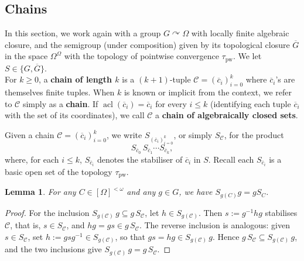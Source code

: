 \documentclass{article}
\newtheorem{lemma}[theorem]{Lemma}
\theoremstyle{remark}
\theoremstyle{definition}
\def\acts{\curvearrowright}
\DeclareMathOperator{\acl}{acl}
\newcommand{\nn}[0]{S}%
\newcommand{\pw}[0]{\tau_{\mathrm{pw}}}
\newcommand{\C}[0]{\mathcal{C}}
\newcommand{\fps}[1]{[#1]^{<\omega}}
\renewcommand\leq{\leqslant}
\renewcommand\geq{\geqslant}
\begin{document}
{{{{{  \subsection{Chains}
 \newcommand{\fts}[1]{(#1)^{\omega}} 
 
 In this section, we work again with a group $G\acts\Omega$ with locally finite algebraic closure, and the semigroup (under composition) given by its topological closure $\overline{G}$ in the space $\Omega^{\Omega}$ with the 
topology of pointwise convergence $\pw$. 
 We let  $S\in\{G, \overline{G}\}$.  \\

For $k \geq 0$, a \textbf{chain of length $k$} is a $(k+1)$-tuple
$\C = (\overline{c}_i)_{i=0}^{k}$ where $\overline{c}_i$'s are
themselves finite tuples. When $k$ is known or implicit from the context, we
refer to $\C$ simply as a \textbf{chain}. If $\acl(\overline{c}_i) =
\overline{c}_i$ for every $i \leq k$ (identifying each tuple
$\overline{c}_i$ with the set of its coordinates), we call $\C$ a
\textbf{chain of algebraically closed sets}.

Given a chain $\C = (\overline{c}_i)_{i=0}^{k}$, we write
$\nn_{(\overline{c}_i)_{i=0}^{k}}$, or simply $\nn_{\C}$, for the product
\begin{equation*}
  \nn_{\overline{c}_0}\,\nn_{\overline{c}_1}\cdots\nn_{\overline{c}_k},
\end{equation*}
where, for each $i \leq k$, $\nn_{\overline{c}_i}$ denotes the stabiliser
of $\overline{c}_i$ in $S$. Recall each $\nn_{\overline{c}_i}$ is a basic open set of the topology $\pw$.
   
 \begin{lemma}
 	\label{o:commutation}  For any 
   $C\in\fps{\Omega}$ 
and any $g\in G$, we have $\nn_{g(C)}g= g\nn_{C}$. 
 \end{lemma}
 \begin{proof}
 For the inclusion $\nn_{g(\C)}\,g \subseteq g\,\nn_{\C}$, let
$h \in \nn_{g(\C)}$. Then $s := g^{-1}hg$ stabilises $\C$, that is,
$s \in \nn_{\C}$, and $hg = gs \in g\,\nn_{\C}$. The reverse inclusion is
analogous: given $s \in \nn_{\C}$, set $h := gsg^{-1} \in \nn_{g(\C)}$, so
that $gs = hg \in \nn_{g(\C)}\,g$. Hence $g\,\nn_{\C} \subseteq
\nn_{g(\C)}\,g$, and the two inclusions give
$\nn_{g(\C)}\,g = g\,\nn_{\C}$.
 \end{proof}
 
}}}}}
\end{document}

